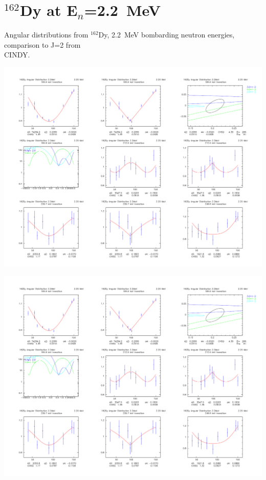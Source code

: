 \section{$^{162}$Dy at E$_n$=2.2~MeV}\label{app:AD_Dy_22}%
Angular distributions from $^{162}$Dy, 2.2~MeV bombarding neutron energies, comparison to J=2 from {\\ CINDY}.
\begin{center}
\includegraphics[page=1,angle=90,height=0.95\textheight]{162Dy_adlegpol_220_2.pdf}
\end{center}
\begin{center}
\includegraphics[page=2,angle=90,height=0.95\textheight]{162Dy_adlegpol_220_2.pdf}
\end{center}
